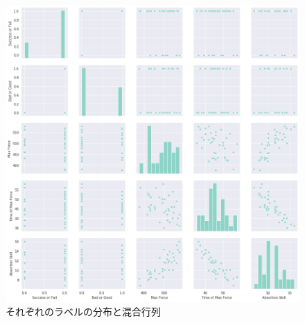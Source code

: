 \begin{figure}[htbp]
\begin{center}
\includegraphics[width=\textwidth]{images/label_correlation.png}
\end{center}
\caption{それぞれのラベルの分布と混合行列}
\label{figure:label_correlation}
\end{figure}
